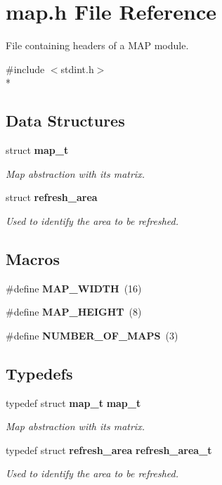 \section{map.\+h File Reference}
\label{map_8h}


File containing headers of a M\+AP module.  


{\ttfamily \#include $<$stdint.\+h$>$}\\*
\subsection*{Data Structures}
\begin{DoxyCompactItemize}
\item 
struct {\bf map\+\_\+t}
\begin{DoxyCompactList}\small\item\em Map abstraction with its matrix. \end{DoxyCompactList}\item 
struct {\bf refresh\+\_\+area}
\begin{DoxyCompactList}\small\item\em Used to identify the area to be refreshed. \end{DoxyCompactList}\end{DoxyCompactItemize}
\subsection*{Macros}
\begin{DoxyCompactItemize}
\item 
\#define {\bfseries M\+A\+P\+\_\+\+W\+I\+D\+TH}~(16)\label{map_8h_aa037a6d6a4f04d51c7ec1c9ee9054e76}

\item 
\#define {\bfseries M\+A\+P\+\_\+\+H\+E\+I\+G\+HT}~(8)\label{map_8h_a529d5ebb449edf31d9835d13f4fb9f89}

\item 
\#define {\bfseries N\+U\+M\+B\+E\+R\+\_\+\+O\+F\+\_\+\+M\+A\+PS}~(3)\label{map_8h_aae83e986d204acd90233d11a62ce9e7e}

\end{DoxyCompactItemize}
\subsection*{Typedefs}
\begin{DoxyCompactItemize}
\item 
typedef struct {\bf map\+\_\+t} {\bf map\+\_\+t}\label{map_8h_adaca599d2c287b0188058b508fb6612a}

\begin{DoxyCompactList}\small\item\em Map abstraction with its matrix. \end{DoxyCompactList}\item 
typedef struct {\bf refresh\+\_\+area} {\bf refresh\+\_\+area\+\_\+t}\label{map_8h_a7b10cc8e3395eb9f6e34a86b53fc5bbb}

\begin{DoxyCompactList}\small\item\em Used to identify the area to be refreshed. \end{DoxyCompactList}\end{DoxyCompactItemize}
